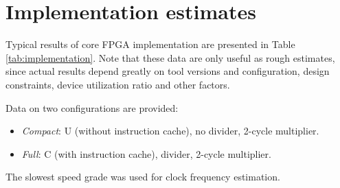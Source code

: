 \documentclass[a4paper,12pt,twoside,extrafontsizes]{memoir}
\begin{document}
\section{Implementation estimates}

Typical results of \lxp{} core FPGA implementation are presented in Table \ref{tab:implementation}. Note that these data are only useful as rough estimates, since actual results depend greatly on tool versions and configuration, design constraints, device utilization ratio and other factors.

Data on two configurations are provided:

\begin{itemize}
	\item \emph{Compact}: \lxp{}U (without instruction cache), no divider, 2-cycle multiplier.
	\item \emph{Full}: \lxp{}C (with instruction cache), divider, 2-cycle multiplier.
\end{itemize}

The slowest speed grade was used for clock frequency estimation.
\end{document}
